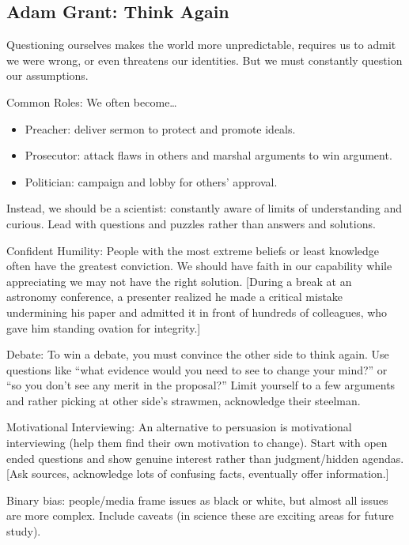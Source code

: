 \documentclass[
]{article}
\begin{document}
\hypertarget{adam-grant-think-again}{%
\subsection{Adam Grant: Think Again}\label{adam-grant-think-again}}

Questioning ourselves makes the world more unpredictable, requires us to
admit we were wrong, or even threatens our identities. But we must
constantly question our assumptions.

Common Roles: We often become\ldots{}

\begin{itemize}
\item
  Preacher: deliver sermon to protect and promote ideals.
\item
  Prosecutor: attack flaws in others and marshal arguments to win
  argument.
\item
  Politician: campaign and lobby for others' approval.
\end{itemize}

Instead, we should be a scientist: constantly aware of limits of
understanding and curious. Lead with questions and puzzles rather than
answers and solutions.

Confident Humility: People with the most extreme beliefs or least
knowledge often have the greatest conviction. We should have faith in
our capability while appreciating we may not have the right solution.
{[}During a break at an astronomy conference, a presenter realized he
made a critical mistake undermining his paper and admitted it in front
of hundreds of colleagues, who gave him standing ovation for
integrity.{]}

Debate: To win a debate, you must convince the other side to think
again. Use questions like ``what evidence would you need to see to
change your mind?'' or ``so you don't see any merit in the proposal?''
Limit yourself to a few arguments and rather picking at other side's
strawmen, acknowledge their steelman.

Motivational Interviewing: An alternative to persuasion is motivational
interviewing (help them find their own motivation to change). Start with
open ended questions and show genuine interest rather than
judgment/hidden agendas. {[}Ask sources, acknowledge lots of confusing
facts, eventually offer information.{]}

Binary bias: people/media frame issues as black or white, but almost all
issues are more complex. Include caveats (in science these are exciting
areas for future study).
\end{document}
